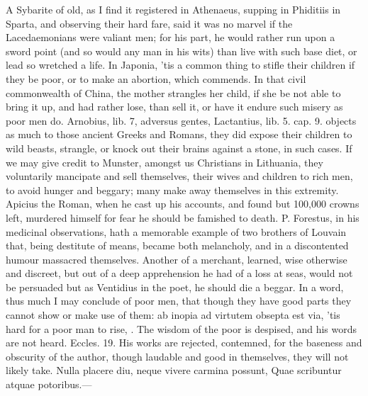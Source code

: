 {A Sybarite of old, as I find it registered in Athenaeus, supping
in Phiditiis in Sparta, and observing their hard fare, said it was no
marvel if the Lacedaemonians were valiant men; for his part, he would
rather run upon a sword point (and so would any man in his wits) than
live with such base diet, or lead so wretched a life. In Japonia,
'tis a common thing to stifle their children if they be poor, or to
make an abortion, which \Aristotle commends. In that civil commonwealth
of China, the mother strangles her child, if she be not able to
bring it up, and had rather lose, than sell it, or have it endure such
misery as poor men do. Arnobius, lib. 7, adversus gentes,
Lactantius, lib. 5. cap. 9. objects as much to those ancient
Greeks and Romans, they did expose their children to wild beasts,
strangle, or knock out their brains against a stone, in such cases. If
we may give credit to Munster, amongst us Christians in
Lithuania, they voluntarily mancipate and sell themselves, their wives
and children to rich men, to avoid hunger and beggary;  many make
away themselves in this extremity. Apicius the Roman, when he cast up
his accounts, and found but 100,000 crowns left, murdered himself for
fear he should be famished to death. P. Forestus, in his medicinal
observations, hath a memorable example of two brothers of Louvain that,
being destitute of means, became both melancholy, and in a discontented
humour massacred themselves. Another of a merchant, learned, wise
otherwise and discreet, but out of a deep apprehension he had of a loss
at seas, would not be persuaded but as Ventidius in the poet, he
should die a beggar. In a word, thus much I may conclude of poor men,
that though they have good parts they cannot show or make use of
them: ab inopia ad virtutem obsepta est via, 'tis hard for a poor
man to  rise, . The wisdom of the poor is despised, and his words
are not heard. Eccles.  19. His works are rejected, contemned, for
the baseness and obscurity of the author, though laudable and good in
themselves, they will not likely take.
Nulla placere diu, neque vivere carmina possunt,
Quae scribuntur atquae potoribus.---

}
